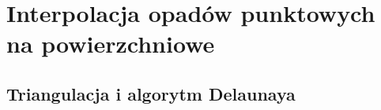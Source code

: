 \chapter{Interpolacja opadów punktowych na powierzchniowe}
\section{Triangulacja i algorytm Delaunaya}